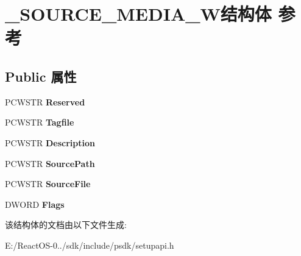 \hypertarget{struct___s_o_u_r_c_e___m_e_d_i_a___w}{}\section{\+\_\+\+S\+O\+U\+R\+C\+E\+\_\+\+M\+E\+D\+I\+A\+\_\+\+W结构体 参考}
\label{struct___s_o_u_r_c_e___m_e_d_i_a___w}
\subsection*{Public 属性}
\begin{DoxyCompactItemize}
\item 
\mbox{\label{struct___s_o_u_r_c_e___m_e_d_i_a___w_a060909e85a0848fa96f478b65db5061d}} 
P\+C\+W\+S\+TR {\bfseries Reserved}
\item 
\mbox{\label{struct___s_o_u_r_c_e___m_e_d_i_a___w_a3eca9caa3aec90dd81ae64894ca8f997}} 
P\+C\+W\+S\+TR {\bfseries Tagfile}
\item 
\mbox{\label{struct___s_o_u_r_c_e___m_e_d_i_a___w_aaa2fd13311aaf0e203935fbc4beae02e}} 
P\+C\+W\+S\+TR {\bfseries Description}
\item 
\mbox{\label{struct___s_o_u_r_c_e___m_e_d_i_a___w_ad8db7aaa7c2dab0a862412f02bb4d50e}} 
P\+C\+W\+S\+TR {\bfseries Source\+Path}
\item 
\mbox{\label{struct___s_o_u_r_c_e___m_e_d_i_a___w_ad3242e0d56a9f1e7517355b42070f3d3}} 
P\+C\+W\+S\+TR {\bfseries Source\+File}
\item 
\mbox{\label{struct___s_o_u_r_c_e___m_e_d_i_a___w_a63fed5d9711213d95f88461118aefd1e}} 
D\+W\+O\+RD {\bfseries Flags}
\end{DoxyCompactItemize}


该结构体的文档由以下文件生成\+:\begin{DoxyCompactItemize}
\item 
E\+:/\+React\+O\+S-\/0../sdk/include/psdk/setupapi.\+h\end{DoxyCompactItemize}
